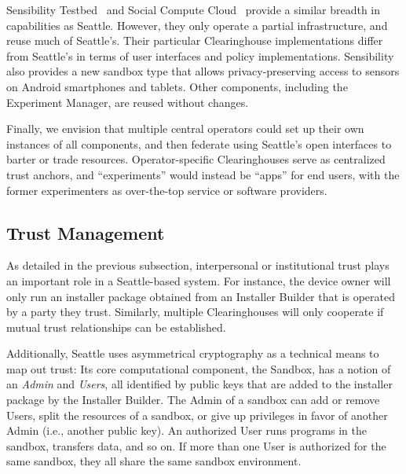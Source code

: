 Sensibility Testbed~\cite{zhuang2014sensibility} and Social Compute
Cloud~\cite{caton2014social} provide a similar breadth in capabilities
as Seattle. However, they only operate a partial infrastructure, and
reuse much of Seattle's. Their particular Clearinghouse
implementations differ from Seattle's in terms of user interfaces
and policy implementations. Sensibility also provides a new sandbox
type that allows privacy-preserving access to sensors on Android
smartphones and tablets. Other components, including the Experiment
Manager, are reused without changes.

Finally, we envision that multiple central operators
could set up their own instances of
all components, and then federate using Seattle's open interfaces
to barter or trade resources. %
Operator-specific Clearinghouses serve as centralized trust
anchors, and ``experiments'' would instead be ``apps'' for
end users, with the former experimenters as over-the-top service or
software providers.



\subsection{Trust Management}\label{sec-trust}

As detailed in the previous subsection, interpersonal or
institutional trust plays an important role in a Seattle-based
system. For instance, the device owner will only run an
installer package obtained from an Installer Builder that is
operated by a party they trust. Similarly, multiple Clearinghouses
will only cooperate if mutual trust relationships can be
established.

Additionally, Seattle uses asymmetrical cryptography as
a technical means to map out trust:
Its core computational component, the Sandbox, has a notion
of an \textit{Admin}
and \textit{Users}, all identified by
public keys that are added to the installer package by the
Installer Builder. The Admin of a sandbox can add or remove
Users, split the resources of a sandbox, or give up privileges
in favor of another Admin (i.e., another public key).
An authorized User runs programs in the sandbox, transfers data,
and so on. If more than one User is authorized for the same
sandbox, they all share the same sandbox environment.


